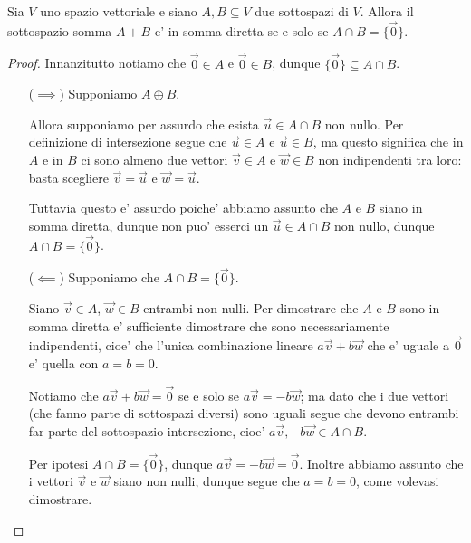 \begin{proposition}
    Sia $V$ uno spazio vettoriale e siano $A, B \subseteq V$ due sottospazi di $V$. Allora il sottospazio somma $A + B$ e' in somma diretta se e solo se $A \cap B = \{\vec 0\}$.
\end{proposition}
\begin{proof}
    Innanzitutto notiamo che $\vec{0} \in A$ e $\vec 0 \in B$, dunque $\{\vec 0\} \subseteq A \cap B$.
    \begin{itemize}
        \item[($\implies$)] Supponiamo $A \oplus B$. 
        
        Allora supponiamo per assurdo che esista $\vec u \in A \cap B$ non nullo. Per definizione di intersezione segue che $\vec u \in A$ e $\vec u \in B$, ma questo significa che in $A$ e in $B$ ci sono almeno due vettori $\vec v \in A$ e $\vec w \in B$ non indipendenti tra loro: basta scegliere $\vec v = \vec u$ e $\vec w = \vec u$. 
        
        Tuttavia questo e' assurdo poiche' abbiamo assunto che $A$ e $B$ siano in somma diretta, dunque non puo' esserci un $\vec u \in A \cap B$ non nullo, dunque $A \cap B = \{\vec 0\}$.
        \item[($\impliedby$)] Supponiamo che $A \cap B = \{\vec 0\}$. 
        
        Siano $\vec v \in A$, $\vec{w} \in B$ entrambi non nulli. Per dimostrare che $A$ e $B$ sono in somma diretta e' sufficiente dimostrare che sono necessariamente indipendenti, cioe' che l'unica combinazione lineare $a\vec v + b\vec w$ che e' uguale a $\vec 0$ e' quella con $a = b = 0$. 
        
        Notiamo che $a\vec v + b\vec w = \vec 0$ se e solo se $a\vec v = -b\vec w$; ma dato che i due vettori (che fanno parte di sottospazi diversi) sono uguali segue che devono entrambi far parte del sottospazio intersezione, cioe' $a\vec v, -b\vec w \in A \cap B$.
        
        Per ipotesi $A \cap B = \{\vec 0\}$, dunque $a\vec v = -b\vec w = \vec 0$. Inoltre abbiamo assunto che i vettori $\vec v$ e $\vec{w}$ siano non nulli, dunque segue che $a = b = 0$, come volevasi dimostrare. \qedhere
    \end{itemize}
\end{proof}

